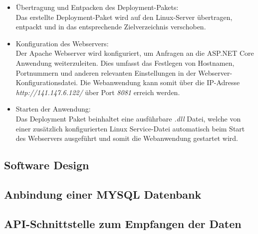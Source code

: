 \documentclass[conference]{IEEEtran}
\begin{document}
\begin{itemize}
	\item Übertragung und Entpacken des Deployment-Pakets: \\
	Das erstellte Deployment-Paket wird auf den Linux-Server übertragen, entpackt und in das entsprechende Zielverzeichnis verschoben.
	\item Konfiguration des Webservers: \\
	Der Apache Webserver wird konfiguriert, um Anfragen an die ASP.NET Core Anwendung weiterzuleiten. Dies umfasst das Festlegen von Hostnamen, Portnummern und anderen relevanten Einstellungen in der Webserver-Konfigurationsdatei. Die Webanwendung kann somit über die IP-Adresse \textit{http://141.147.6.122/} über Port \textit{8081} erreich werden.
	\item Starten der Anwendung: \\
	Das Deployment Paket beinhaltet eine ausführbare \textit{.dll} Datei, welche von einer zusätzlich konfigurierten Linux Service-Datei automatisch beim Start des Webservers ausgeführt und somit die Webanwendung gestartet wird.
\end{itemize}
\subsection{Software Design}
\subsection{Anbindung einer MYSQL Datenbank}
\subsection{API-Schnittstelle zum Empfangen der Daten}
\end{document}
